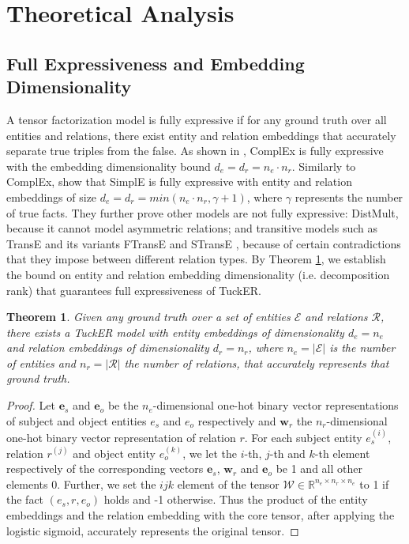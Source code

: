 \documentclass[11pt,a4paper]{article}
\newtheorem{theorem}{Theorem}
\begin{document}
\section{Theoretical Analysis}
\subsection{Full Expressiveness and Embedding Dimensionality} \label{sec:expressive}

A tensor factorization model is fully expressive if for any ground truth over all entities and relations, there exist entity and relation embeddings that accurately separate true triples from the false. As shown in \cite{trouillon2017knowledge}, ComplEx is fully expressive with the embedding dimensionality bound $d_e=d_r=n_e \cdot n_r$. Similarly to ComplEx, \citet{kazemi2018simple} show that SimplE is fully expressive with entity and relation embeddings of size $d_e=d_r=\textit{min}(n_e \cdot n_r, \gamma + 1)$, where $\gamma$ represents the number of true facts. They further prove other models are not fully expressive: DistMult, because it cannot model asymmetric relations; and transitive models such as TransE \cite{bordes2013translating} and its variants FTransE \cite{feng2016knowledge} and STransE \cite{nguyen2016stranse}, because of certain contradictions that they impose between different relation types. By Theorem \ref{theorem1}, we establish the bound on entity and relation embedding dimensionality (i.e. decomposition rank) that guarantees full expressiveness of TuckER.

\begin{theorem} \label{theorem1}
Given any ground truth over a set of entities $\mathcal{E}$ and relations $\mathcal{R}$, there exists a TuckER model with entity embeddings of dimensionality $d_e=n_e$ and relation embeddings of dimensionality $d_r=n_r$, where $n_e=|\mathcal{E}|$ is the number of entities and $n_r = |\mathcal{R}|$ the number of relations, that accurately represents that ground truth.
\end{theorem} 
\vspace{-0.2cm}
\begin{proof}
Let $\mathbf{e}_s$ and $\mathbf{e}_o$ be the $n_e$-dimensional one-hot binary vector representations of subject and object entities $e_s$ and $e_o$ respectively and $\mathbf{w}_r$ the $n_r$-dimensional one-hot binary vector representation of relation $r$. For each subject entity $e_s^{(i)}$, relation $r^{(j)}$ and object entity $e_o^{(k)}$, we let the $i$-th, $j$-th and $k$-th element respectively of the corresponding vectors $\mathbf{e}_s$, $\mathbf{w}_r$ and $\mathbf{e}_o$ be 1 and all other elements 0. Further, we set the $ijk$ element of the tensor $\mathcal{W} \in \mathbb{R}^{n_e \times n_r \times n_e}$ to 1 if the fact $(e_s, r, e_o)$ holds and -1 otherwise. Thus the product of the entity embeddings and the relation embedding with the core tensor, after applying the logistic sigmoid, accurately represents the original tensor.
\end{proof}
\end{document}
